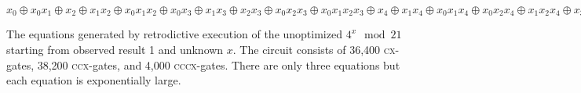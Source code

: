 \documentclass[sigplan]{acmart}
\newcommand{\cx}{\textsc{cx}}
\newcommand{\ccx}{\textsc{ccx}}
\newcommand{\cccx}{\textsc{cccx}}
\begin{document}
\bigskip

$x_0 \oplus x_0x_1 \oplus x_2 \oplus x_1x_2 \oplus x_0x_1x_2 \oplus
x_0x_3 \oplus x_1x_3 \oplus x_2x_3 \oplus x_0x_2x_3 \oplus
x_0x_1x_2x_3 \oplus x_4 \oplus x_1x_4 \oplus x_0x_1x_4 \oplus
x_0x_2x_4 \oplus x_1x_2x_4 \oplus x_3x_4 \oplus x_0x_3x_4 \oplus
x_0x_1x_3x_4 \oplus x_2x_3x_4 \oplus x_1x_2x_3x_4 \oplus
x_0x_1x_2x_3x_4 \oplus x_0x_5 \oplus x_1x_5 \oplus x_2x_5 \oplus
x_0x_2x_5 \oplus x_0x_1x_2x_5 \oplus x_3x_5 \oplus x_1x_3x_5 \oplus
x_0x_1x_3x_5 \oplus x_0x_2x_3x_5 \oplus x_1x_2x_3x_5 \oplus x_4x_5
\oplus x_0x_4x_5 \oplus x_0x_1x_4x_5 \oplus x_2x_4x_5 \oplus
x_1x_2x_4x_5 \oplus x_0x_1x_2x_4x_5 \oplus x_0x_3x_4x_5 \oplus
x_1x_3x_4x_5 \oplus x_2x_3x_4x_5 \oplus x_0x_2x_3x_4x_5 \oplus
x_0x_1x_2x_3x_4x_5 = 0$

\bigskip

The equations generated by retrodictive execution of the unoptimized
$4^x \mod{21}$ starting from observed result 1 and unknown $x$. The
circuit consists of 36,400 \cx-gates, 38,200 \ccx-gates, and 4,000
\cccx-gates. There are only three equations but each equation is
exponentially large.



\end{document}
